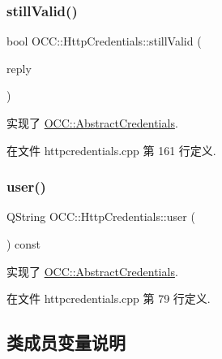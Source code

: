 \subsubsection{\texorpdfstring{still\+Valid()}{stillValid()}}
{\footnotesize\ttfamily bool O\+C\+C\+::\+Http\+Credentials\+::still\+Valid (\begin{DoxyParamCaption}\item[{Q\+Network\+Reply $\ast$}]{reply }\end{DoxyParamCaption})\hspace{0.3cm}{\ttfamily [virtual]}}



实现了 \hyperlink{class_o_c_c_1_1_abstract_credentials_a13eca92c3c27886aecd39c6912b7e225}{O\+C\+C\+::\+Abstract\+Credentials}.



在文件 httpcredentials.\+cpp 第 161 行定义.

\mbox{\label{class_o_c_c_1_1_http_credentials_a017bf9144c7659f777b9aabc98e03987}} 
\subsubsection{\texorpdfstring{user()}{user()}}
{\footnotesize\ttfamily Q\+String O\+C\+C\+::\+Http\+Credentials\+::user (\begin{DoxyParamCaption}{ }\end{DoxyParamCaption}) const\hspace{0.3cm}{\ttfamily [virtual]}}



实现了 \hyperlink{class_o_c_c_1_1_abstract_credentials_a8d96306a2d4af6c6dcffaa0b7c5b46f8}{O\+C\+C\+::\+Abstract\+Credentials}.



在文件 httpcredentials.\+cpp 第 79 行定义.



\subsection{类成员变量说明}
\mbox{\label{class_o_c_c_1_1_http_credentials_a9c2d6ae8de7b3b904914b8feba4ad7bc}} 

